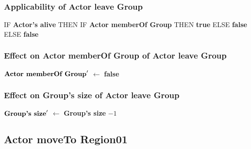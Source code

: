 \documentclass{article}%
\begin{document}
%
\subsubsection{Applicability of Actor leave Group}%
\label{ssubsec:Applicability of Actor leave Group}%
\begin{flushleft}%
IF %
\textbf{Actor's alive}%
\linebreak%
\hspace*{2em}%
THEN %
IF %
\textbf{Actor memberOf Group}%
\linebreak%
\hspace*{4em}%
THEN %
\textbf{true}%
\linebreak%
\hspace*{4em}%
ELSE %
\textbf{false}%
\linebreak%
\hspace*{2em}%
ELSE %
\textbf{false}%
\end{flushleft}

%
\subsubsection{Effect on Actor memberOf Group of Actor leave Group}%
\label{ssubsec:Effect on Actor memberOf Group of Actor leave Group}%
\begin{flushleft}%
$\mbox{\textbf{Actor memberOf Group}} '$%
$\leftarrow$%
\textbf{false}%
\end{flushleft}

%
\subsubsection{Effect on Group's size of Actor leave Group}%
\label{ssubsec:Effect on Group's size of Actor leave Group}%
\begin{flushleft}%
$\mbox{\textbf{Group's size}} '$%
$\leftarrow$%
\textbf{Group's size}%
${-}1$%
\end{flushleft}

%
\subsection{Actor moveTo Region01}%
\label{subsec:Actor moveTo Region01}%
\end{document}
